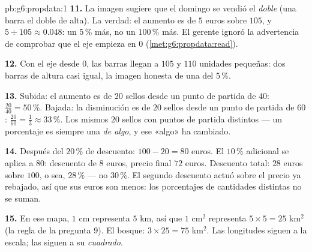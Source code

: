 \begin{solution}{pb:g6:propdata:1}
\textbf{11.} La imagen sugiere que el domingo se vendió el \emph{doble}
(una barra el doble de alta). La verdad: el aumento es de $5$ euros sobre
$105$, y $5 \div 105 \approx 0.048$: un $5\,\%$ más,
no un $100\,\%$ más. El gerente ignoró la advertencia de comprobar
que el eje empieza en $0$
(\cref{met:g6:propdata:read}).

\textbf{12.} Con el eje desde $0$, las barras llegan a $105$ y
$110$ unidades pequeñas: dos barras de altura casi igual, la
imagen honesta de una  del $5\,\%$.

\textbf{13.} Subida: el aumento es de $20$ sellos desde un punto de partida de
$40$: $\frac{20}{40} = 50\,\%$. Bajada: la disminución es de $20$
sellos desde un punto de partida de $60$: $\frac{20}{60} = \frac13 \approx
33\,\%$. Los mismos $20$ sellos con puntos de partida distintos --- un
porcentaje es siempre una  \emph{de algo}, y ese
«algo» ha cambiado.

\textbf{14.} Después del $20\,\%$ de descuento: $100 - 20 = 80$ euros. El
$10\,\%$ adicional se aplica a $80$: descuento de $8$ euros, precio final
$72$ euros. Descuento total: $28$ euros sobre $100$, o sea,
$28\,\%$ --- no $30\,\%$. El segundo descuento actuó sobre el
precio ya rebajado, así que sus euros son menos: los porcentajes de
cantidades distintas no se suman.

\textbf{15.} En ese mapa, $1$ cm representa $5$ km, así que $1$
cm$^2$ representa $5 \times 5 = 25$ km$^2$ (la regla de la pregunta 9).
El bosque: $3 \times 25 = 75$ km$^2$. Las longitudes siguen a la
escala; las  siguen a su \emph{cuadrado}.
\end{solution}
